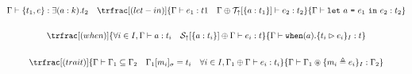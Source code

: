 \documentclass{article}[11pt]
\newcommand{\term}[1]{\verb~#1~}
\begin{document}
{\begin{gather*}
            {\Gamma \vdash \{t_1,e\} : \exists (a:k).t_2}
            ~~~
            \trfrac[(let-in)]
            {\Gamma \vdash e_1 : t1 ~~~ \Gamma \oplus {\cal T}_\uparrow[\{ a : t_1 \}] \vdash e_2 : t_2}
            {\Gamma \vdash \term{let} ~ a ~ \term{=} ~ e_1 ~ \term{in} ~ e_2 : t_2}
            \\\\
            \trfrac[(when)]
            {\forall i \in I, \Gamma \vdash a : t_i ~~~ {\cal S}_\uparrow[\{ a : t_i \}] \oplus \Gamma \vdash e_i : t }
            {\Gamma \vdash \term{when}(a).\{ t_i \rhd e_i \}_I : t}
            \\\\
            \trfrac[(trait)]
            {\Gamma \vdash \Gamma_1 \subseteq \Gamma_2 ~~~ \Gamma_1[m_i]_\sigma = t_i ~~~ \forall i \in I, \Gamma_1 \oplus \Gamma \vdash e_i : t_i }
            {\Gamma \vdash \Gamma_1 \circledast \{ m_i \triangleq e_i \}_I : \Gamma_2 }\\
        \end{gather*}
    }
\end{document}
